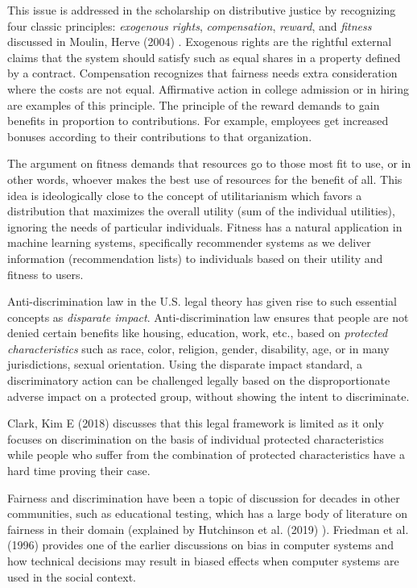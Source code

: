     This issue is addressed in the scholarship on distributive justice by recognizing four classic principles: \textit{exogenous rights}, \textit{compensation}, \textit{reward}, and  \textit{fitness} discussed in Moulin, Herve (2004) \cite{Moulin:FairDivision}. Exogenous rights are the rightful external claims that the system should satisfy such as equal shares in a property defined by a contract. Compensation recognizes that fairness needs extra consideration where the costs are not equal. Affirmative action in college admission or in hiring are examples of this principle. The principle of the reward demands to gain benefits in proportion to contributions. For example, employees get increased bonuses according to their contributions to that organization.
    
    The argument on fitness demands that resources go to those most fit to use, or in other words, whoever makes the best use of resources for the benefit of all. This idea is ideologically close to the concept of utilitarianism which favors a distribution that maximizes the overall utility (sum of the individual utilities), ignoring the needs of particular individuals. Fitness has a natural application in machine learning systems, specifically recommender systems as we deliver information (recommendation lists) to individuals based on their utility and fitness to users.
    
    Anti-discrimination law in the U.S. legal theory has given rise to such essential concepts as \textit{disparate impact}. Anti-discrimination law ensures that people are not denied certain benefits like housing, education, work, etc., based on \textit{protected characteristics} such as race, color, religion, gender, disability, age, or in many jurisdictions, sexual orientation. Using the disparate impact standard, a discriminatory action can be challenged legally based on the disproportionate adverse impact on a protected group, without showing the intent to discriminate.
    
    Clark, Kim E (2018) \cite{clark2018demarginalizing} discusses that this legal framework is limited as it only focuses on discrimination on the basis of individual protected characteristics while people who suffer from the combination of protected characteristics have a hard time proving their case.
    
    Fairness and discrimination have been a topic of discussion for decades in other communities, such as educational testing, which has a large body of literature on fairness in their domain (explained by Hutchinson et al. (2019) \cite{Hutchinson2019history}). Friedman et al. (1996) \cite{Friedman1996Bias} provides one of the earlier discussions on bias in computer systems and how technical decisions may result in biased effects when computer systems are used in the social context. 
    
